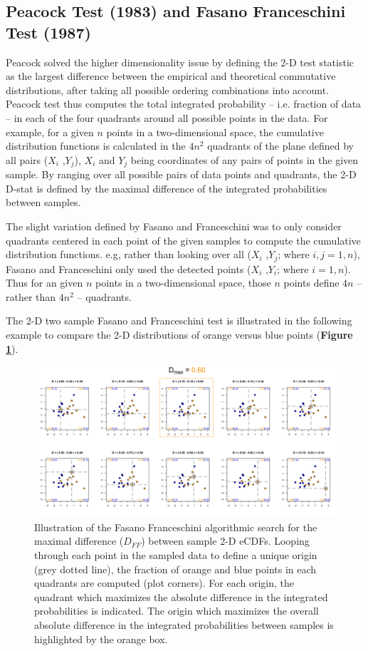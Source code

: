\documentclass[codesnippet]{jss}
\begin{document}
\subsection{Peacock Test (1983) and Fasano Franceschini Test (1987)}
Peacock solved the higher dimensionality issue by defining the 2-D test statistic as the largest difference between the empirical and theoretical commutative distributions, after taking all possible ordering combinations into account. Peacock test thus computes the total integrated probability -- i.e. fraction of data -- in each of the four quadrants around all possible points in the data. For example, for a given $n$ points in a two-dimensional space, the cumulative distribution functions is calculated in the $4n^2$ quadrants of the plane defined by all pairs ($X_i$ ,$Y_j$), $X_i$ and $Y_j$ being coordinates of any pairs of points in the given sample. By ranging over all possible pairs of data points and quadrants, the 2-D D-stat is defined by the maximal difference of the integrated probabilities between samples.

The slight variation defined by Fasano and Franceschini was to only consider quadrants centered in each point of the given samples to compute the cumulative distribution functions. e.g, rather than looking over all ($X_i$ ,$Y_j$; where $i,j={1,n}$), Fasano and Franceschini only used the detected points ($X_i$ ,$Y_i$; where $i={1,n}$). Thus for an given $n$ points in a two-dimensional space, those $n$ points define $4n$ -- rather than $4n^2$ -- quadrants.

The 2-D two sample Fasano and Franceschini test is illustrated in the following example to compare the 2-D distributions of orange versus blue points (\textbf{Figure \ref{fig:kstest2D}}).

\begin{figure}[t!]
\centering
\includegraphics{fftestOutput}
\caption{\label{fig:kstest2D} Illustration of the Fasano Franceschini algorithmic search for the maximal difference ($D_{FF}$) between sample 2-D eCDFs. Looping through each point in the sampled data to define a unique origin (grey dotted line), the fraction of orange and blue points in each quadrants are computed (plot corners). For each origin, the quadrant which maximizes the absolute difference in the integrated probabilities is indicated. The origin which maximizes the overall absolute difference in the integrated probabilities between samples is highlighted by the orange box.
}
\end{figure}
\end{document}
